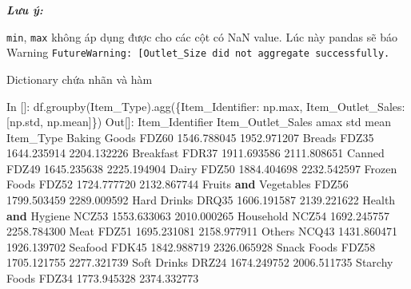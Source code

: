\documentclass[
]{book}
\makeatletter
\newenvironment{Shaded}{\begin{snugshade}}{\end{snugshade}}
\newcommand{\BuiltInTok}[1]{#1}
\newcommand{\FloatTok}[1]{\textcolor[rgb]{0.00,0.00,0.81}{#1}}
\newcommand{\KeywordTok}[1]{\textcolor[rgb]{0.13,0.29,0.53}{\textbf{#1}}}
\newcommand{\NormalTok}[1]{#1}
\newcommand{\StringTok}[1]{\textcolor[rgb]{0.31,0.60,0.02}{#1}}
\newenvironment{kframe}{%
\medskip{}
\setlength{\fboxsep}{.8em}
 \def\at@end@of@kframe{}%
 \ifinner\ifhmode%
  \def\at@end@of@kframe{\end{minipage}}%
  \begin{minipage}{\columnwidth}%
 \fi\fi%
 \def\FrameCommand##1{\hskip\@totalleftmargin \hskip-\fboxsep
 \colorbox{shadecolor}{##1}\hskip-\fboxsep
     \hskip-\linewidth \hskip-\@totalleftmargin \hskip\columnwidth}%
 \MakeFramed {\advance\hsize-\width
   \@totalleftmargin\z@ \linewidth\hsize
   \@setminipage}}%
 {\par\unskip\endMakeFramed%
 \at@end@of@kframe}
\newenvironment{rmdblock}[1]
  {
  \begin{itemize}
  \renewcommand{\labelitemi}{
    \raisebox{-.7\height}[0pt][0pt]{
      {\setkeys{Gin}{width=3em,keepaspectratio}\texttt{[image: images/\#1]}}
    }
  }
  \setlength{\fboxsep}{1em}
  \begin{kframe}
  \item
  }
  {
  \end{kframe}
  \end{itemize}
  }
\newenvironment{rmdnote}
  {\begin{rmdblock}{note}}
  {\end{rmdblock}}
\makeatother
\begin{document}
\begin{rmdnote}
\textbf{\emph{Lưu ý:}}

\texttt{min}, \texttt{max} không áp dụng được cho các cột có NaN value. Lúc này pandas sẽ báo Warning \texttt{FutureWarning:\ {[}\textquotesingle{}Outlet\_Size\textquotesingle{}{]}\ did\ not\ aggregate\ successfully.}
\end{rmdnote}

Dictionary chứa nhãn và hàm

\begin{Shaded}
\begin{Highlighting}[]
\NormalTok{In []: df.groupby(}\StringTok{\textquotesingle{}Item\_Type\textquotesingle{}}\NormalTok{).agg(\{}\StringTok{\textquotesingle{}Item\_Identifier\textquotesingle{}}\NormalTok{: np.}\BuiltInTok{max}\NormalTok{, }\StringTok{\textquotesingle{}Item\_Outlet\_Sales\textquotesingle{}}\NormalTok{: [np.std, np.mean]\})}
\NormalTok{Out[]:}
\NormalTok{                      Item\_Identifier Item\_Outlet\_Sales             }
\NormalTok{                                 amax               std         mean}
\NormalTok{Item\_Type                                                           }
\NormalTok{Baking Goods                    FDZ60       }\FloatTok{1546.788045}  \FloatTok{1952.971207}
\NormalTok{Breads                          FDZ35       }\FloatTok{1644.235914}  \FloatTok{2204.132226}
\NormalTok{Breakfast                       FDR37       }\FloatTok{1911.693586}  \FloatTok{2111.808651}
\NormalTok{Canned                          FDZ49       }\FloatTok{1645.235638}  \FloatTok{2225.194904}
\NormalTok{Dairy                           FDZ50       }\FloatTok{1884.404698}  \FloatTok{2232.542597}
\NormalTok{Frozen Foods                    FDZ52       }\FloatTok{1724.777720}  \FloatTok{2132.867744}
\NormalTok{Fruits }\KeywordTok{and}\NormalTok{ Vegetables           FDZ56       }\FloatTok{1799.503459}  \FloatTok{2289.009592}
\NormalTok{Hard Drinks                     DRQ35       }\FloatTok{1606.191587}  \FloatTok{2139.221622}
\NormalTok{Health }\KeywordTok{and}\NormalTok{ Hygiene              NCZ53       }\FloatTok{1553.633063}  \FloatTok{2010.000265}
\NormalTok{Household                       NCZ54       }\FloatTok{1692.245757}  \FloatTok{2258.784300}
\NormalTok{Meat                            FDZ51       }\FloatTok{1695.231081}  \FloatTok{2158.977911}
\NormalTok{Others                          NCQ43       }\FloatTok{1431.860471}  \FloatTok{1926.139702}
\NormalTok{Seafood                         FDK45       }\FloatTok{1842.988719}  \FloatTok{2326.065928}
\NormalTok{Snack Foods                     FDZ58       }\FloatTok{1705.121755}  \FloatTok{2277.321739}
\NormalTok{Soft Drinks                     DRZ24       }\FloatTok{1674.249752}  \FloatTok{2006.511735}
\NormalTok{Starchy Foods                   FDZ34       }\FloatTok{1773.945328}  \FloatTok{2374.332773}
\end{Highlighting}
\end{Shaded}
\end{document}
